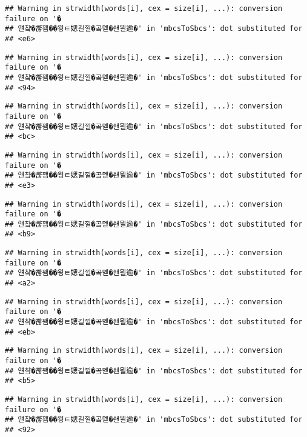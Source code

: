\documentclass[]{article}
\begin{document}
\begin{verbatim}
## Warning in strwidth(words[i], cex = size[i], ...): conversion failure on '�
## 얜챸�뺞꽴��욍ㅌ媤길낄�곸몓�쇈묄逾�' in 'mbcsToSbcs': dot substituted for
## <e6>
\end{verbatim}

\begin{verbatim}
## Warning in strwidth(words[i], cex = size[i], ...): conversion failure on '�
## 얜챸�뺞꽴��욍ㅌ媤길낄�곸몓�쇈묄逾�' in 'mbcsToSbcs': dot substituted for
## <94>
\end{verbatim}

\begin{verbatim}
## Warning in strwidth(words[i], cex = size[i], ...): conversion failure on '�
## 얜챸�뺞꽴��욍ㅌ媤길낄�곸몓�쇈묄逾�' in 'mbcsToSbcs': dot substituted for
## <bc>
\end{verbatim}

\begin{verbatim}
## Warning in strwidth(words[i], cex = size[i], ...): conversion failure on '�
## 얜챸�뺞꽴��욍ㅌ媤길낄�곸몓�쇈묄逾�' in 'mbcsToSbcs': dot substituted for
## <e3>
\end{verbatim}

\begin{verbatim}
## Warning in strwidth(words[i], cex = size[i], ...): conversion failure on '�
## 얜챸�뺞꽴��욍ㅌ媤길낄�곸몓�쇈묄逾�' in 'mbcsToSbcs': dot substituted for
## <b9>
\end{verbatim}

\begin{verbatim}
## Warning in strwidth(words[i], cex = size[i], ...): conversion failure on '�
## 얜챸�뺞꽴��욍ㅌ媤길낄�곸몓�쇈묄逾�' in 'mbcsToSbcs': dot substituted for
## <a2>
\end{verbatim}

\begin{verbatim}
## Warning in strwidth(words[i], cex = size[i], ...): conversion failure on '�
## 얜챸�뺞꽴��욍ㅌ媤길낄�곸몓�쇈묄逾�' in 'mbcsToSbcs': dot substituted for
## <eb>
\end{verbatim}

\begin{verbatim}
## Warning in strwidth(words[i], cex = size[i], ...): conversion failure on '�
## 얜챸�뺞꽴��욍ㅌ媤길낄�곸몓�쇈묄逾�' in 'mbcsToSbcs': dot substituted for
## <b5>
\end{verbatim}

\begin{verbatim}
## Warning in strwidth(words[i], cex = size[i], ...): conversion failure on '�
## 얜챸�뺞꽴��욍ㅌ媤길낄�곸몓�쇈묄逾�' in 'mbcsToSbcs': dot substituted for
## <92>
\end{verbatim}
\end{document}
